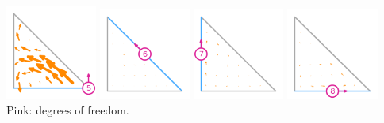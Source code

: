 \begin{itemize}
\begin{center}
\includegraphics[width=3cm]{images/pair_mtw/element-Mardal-Tai-Winther-variant-equispaced-triangle-3-5}
\includegraphics[width=3cm]{images/pair_mtw/element-Mardal-Tai-Winther-variant-equispaced-triangle-3-6}
\includegraphics[width=3cm]{images/pair_mtw/element-Mardal-Tai-Winther-variant-equispaced-triangle-3-7}
\includegraphics[width=3cm]{images/pair_mtw/element-Mardal-Tai-Winther-variant-equispaced-triangle-3-8}\\
{\captionfont Pink: degrees of freedom.}
\end{center}




\end{itemize}

